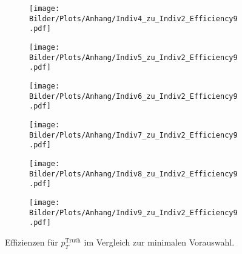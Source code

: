 \begin{figure}
  \begin{subfigure}[t]{0.5\textwidth}
  \texttt{[image: Bilder/Plots/Anhang/Indiv4\_zu\_Indiv2\_Efficiency9.pdf]}
  \end{subfigure}
\begin{subfigure}[t]{0.5\textwidth}
 \texttt{[image: Bilder/Plots/Anhang/Indiv5\_zu\_Indiv2\_Efficiency9.pdf]}
\end{subfigure}
\begin{subfigure}[t]{0.5\textwidth}
  \texttt{[image: Bilder/Plots/Anhang/Indiv6\_zu\_Indiv2\_Efficiency9.pdf]}
\end{subfigure}
\begin{subfigure}[t]{0.5\textwidth}
  \texttt{[image: Bilder/Plots/Anhang/Indiv7\_zu\_Indiv2\_Efficiency9.pdf]}
\end{subfigure}
\begin{subfigure}[t]{0.5\textwidth}
  \texttt{[image: Bilder/Plots/Anhang/Indiv8\_zu\_Indiv2\_Efficiency9.pdf]}
\end{subfigure}
\begin{subfigure}[t]{0.5\textwidth}
  \texttt{[image: Bilder/Plots/Anhang/Indiv9\_zu\_Indiv2\_Efficiency9.pdf]}
\end{subfigure}
\caption{Effizienzen für $p_T^{\text{Truth}}$ im Vergleich zur minimalen Vorauswahl.}
\end{figure}
\clearpage

